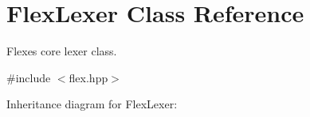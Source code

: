 \hypertarget{classFlexLexer}{}\section{Flex\+Lexer Class Reference}
\label{classFlexLexer}


Flex\textquotesingle{}es core lexer class.  




{\ttfamily \#include $<$flex.\+hpp$>$}



Inheritance diagram for Flex\+Lexer\+:
